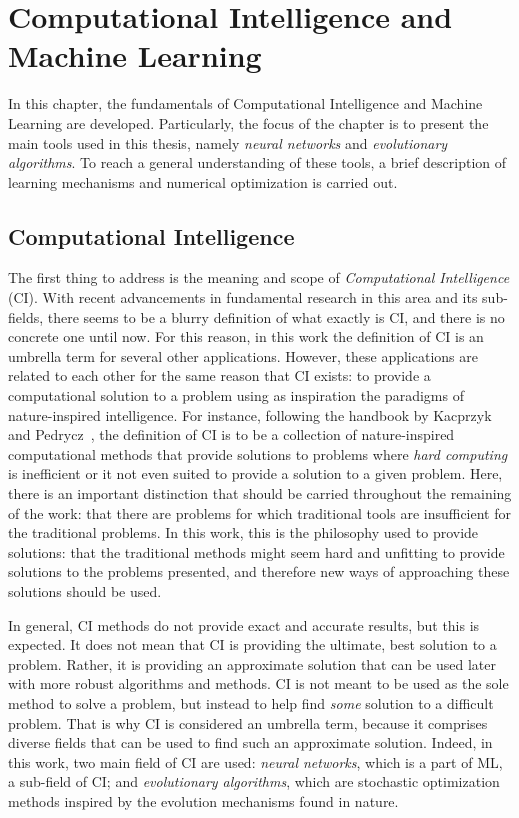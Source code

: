 \chapter{Computational Intelligence and Machine Learning}
\label{Cap3}

In this chapter, the fundamentals of Computational Intelligence and Machine Learning 
are developed. Particularly, the focus of the chapter is to present the main tools 
used in this thesis, namely \emph{neural networks} and \emph{evolutionary algorithms}. To 
reach a general understanding of these tools, a brief description of learning mechanisms
and numerical optimization is carried out.

\section{Computational Intelligence}
The first thing to address is the meaning and scope of \emph{Computational 
Intelligence} (CI). With recent advancements in fundamental research in this area
and its sub-fields, there seems to be a blurry definition of what exactly is CI, and there 
is no concrete one until now. For this reason, in this work the definition of CI is an 
umbrella term for several other applications. However, these applications are related to 
each other for the same reason that CI exists: to provide a computational solution to a 
problem using as inspiration the paradigms of nature-inspired intelligence. For instance, 
following the handbook by Kacprzyk and 
Pedrycz~\cite{kacprzykSpringerHandbookComputational2015},
the definition of CI is to be a collection of nature-inspired computational methods that
provide solutions to problems where \emph{hard computing} is inefficient or it not even
suited to provide a solution to a given problem. Here, there is an important distinction
that should be carried throughout the remaining of the work: that there are problems for
which traditional tools are insufficient for the traditional problems. In this work, this
is the philosophy used to provide solutions: that the traditional methods might seem hard 
and unfitting to provide solutions to the problems presented, and therefore new ways of 
approaching these solutions should be used.

In general, CI methods do not provide exact and accurate results, but this is expected.
It does not mean that CI is providing the ultimate, best solution to a problem. Rather, it 
is providing an approximate solution that can be used later with more robust algorithms and
methods. CI is not meant to be used as the sole method to solve a problem, but instead to
help find \emph{some} solution to a difficult problem. That is why CI is considered an 
umbrella term, because it comprises diverse fields that can be used to find such an 
approximate solution. Indeed, in this work, two main field of CI are used:
\emph{neural networks}, which is a part of ML, a sub-field of CI; and
\emph{evolutionary algorithms}, which are stochastic optimization methods inspired by the 
evolution mechanisms found in nature.

